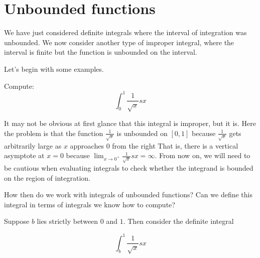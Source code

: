\documentclass{ximera}
\begin{document}
\section{Unbounded functions}

We have just considered definite integrals where the interval of
integration was unbounded. We now consider another type of improper
integral, where the interval is finite but the function is unbounded on the interval. 




Let's begin with some examples.

\begin{example}	
  Compute:
  \[
  \int_{0}^1 \frac{1}{\sqrt{x}} sx
  \]
  \begin{explanation}
It may not be obvious at first glance that this integral is improper, but it is.  Here the problem is that the function $\frac{1}{\sqrt{x}}$ is unbounded on $[0,1]$ because $\frac{1}{\sqrt{x}}$ gets arbitrarily large as $x$ approaches $0$ from the right That is, there is a vertical asymptote at $x=0$ because $\lim_{x \to 0^+} \frac{1}{\sqrt{x}} sx = \infty$. From now on, we will need to be cautious when evaluating integrals to check whether the integrand is bounded on the region of integration. 

How then do we work with integrals of unbounded functions?  Can we define this integral in terms of integrals we know how to compute?

Suppose $b$ lies strictly between $0$ and $1$. Then consider the definite integral

\[
\int_{b}^{1} \frac{1}{\sqrt{x}} sx
\]

\begin{image}
\end{image}


\end{explanation}
\end{example}
\end{document}
